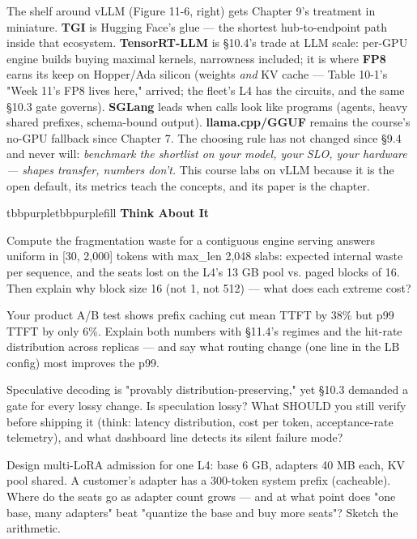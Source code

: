 The shelf around vLLM (Figure 11-6, right) gets Chapter 9's treatment in miniature. \textbf{TGI} is Hugging Face's glue — the shortest hub-to-endpoint path inside that ecosystem. \textbf{TensorRT-LLM} is §10.4's trade at LLM scale: per-GPU engine builds buying maximal kernels, narrowness included; it is where \textbf{FP8} earns its keep on Hopper/Ada silicon (weights \textit{and} KV cache — Table 10-1's "Week 11's FP8 lives here," arrived; the fleet's L4 has the circuits, and the same §10.3 gate governs). \textbf{SGLang} leads when calls look like programs (agents, heavy shared prefixes, schema-bound output). \textbf{llama.cpp/GGUF} remains the course's no-GPU fallback since Chapter 7. The choosing rule has not changed since §9.4 and never will: \textit{benchmark the shortlist on your model, your SLO, your hardware — shapes transfer, numbers don't.} This course labs on vLLM because it is the open default, its metrics teach the concepts, and its paper is the chapter.

\begin{calloutbox}{tbbpurple}{tbbpurplefill}
{\normalsize\bfseries\color{tbbpurple}Think About It}\par\vspace{3pt}
\begin{tbbitemize}
  \item Compute the fragmentation waste for a contiguous engine serving answers uniform in [30, 2,000] tokens with max\_len 2,048 slabs: expected internal waste per sequence, and the seats lost on the L4's 13 GB pool vs. paged blocks of 16. Then explain why block size 16 (not 1, not 512) — what does each extreme cost?
  \item Your product A/B test shows prefix caching cut mean TTFT by 38\% but p99 TTFT by only 6\%. Explain both numbers with §11.4's regimes and the hit-rate distribution across replicas — and say what routing change (one line in the LB config) most improves the p99.
  \item Speculative decoding is "provably distribution-preserving," yet §10.3 demanded a gate for every lossy change. Is speculation lossy? What SHOULD you still verify before shipping it (think: latency distribution, cost per token, acceptance-rate telemetry), and what dashboard line detects its silent failure mode?
  \item Design multi-LoRA admission for one L4: base 6 GB, adapters 40 MB each, KV pool shared. A customer's adapter has a 300-token system prefix (cacheable). Where do the seats go as adapter count grows — and at what point does "one base, many adapters" beat "quantize the base and buy more seats"? Sketch the arithmetic.
\end{tbbitemize}
\end{calloutbox}

